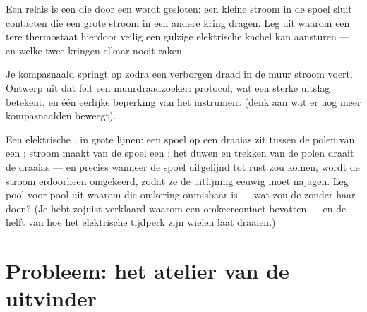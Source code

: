 \begin{exercise}[$\star\star$]\label{exo:g8:electric-current-effects:10}
Een relais is een  die door een
 wordt gesloten: een kleine stroom in de spoel
sluit contacten die een grote stroom in een andere kring dragen. Leg
uit waarom een tere thermostaat hierdoor veilig een gulzige
elektrische kachel kan aansturen --- en welke twee kringen elkaar nooit
raken.
\end{exercise}

\begin{exercise}[$\star\star$]\label{exo:g8:electric-current-effects:11}
Je kompasnaald springt op zodra een verborgen draad in de muur
stroom voert. Ontwerp uit dat feit een muurdraadzoeker: protocol, wat
een sterke uitslag betekent, en één eerlijke beperking van het
instrument (denk aan wat er nog meer kompasnaalden beweegt).
\end{exercise}

\begin{exercise}[$\star\star\star$]\label{exo:g8:electric-current-effects:12}
Een elektrische , in grote lijnen: een spoel op een draaias zit
tussen de polen van een ; stroom maakt van de spoel een
; het duwen en trekken van de polen draait de draaias --- en
precies wanneer de spoel uitgelijnd tot rust zou komen, wordt de
stroom erdoorheen omgekeerd, zodat ze de uitlijning eeuwig moet
najagen. Leg pool voor pool uit waarom die omkering onmisbaar is ---
wat zou de  zonder haar doen? (Je hebt zojuist verklaard
waarom  een omkeercontact bevatten --- en de helft van hoe
het elektrische tijdperk zijn wielen laat draaien.)
\end{exercise}

\section{Probleem: het atelier van de uitvinder}

